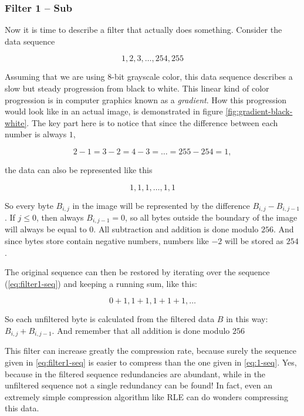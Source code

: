 \subsubsection{Filter 1 -- Sub}

Now it is time to describe a filter that actually does
something. Consider the data sequence

\begin{equation}
  \label{eq:1-seq}
  1,2,3,\dots,254,255
\end{equation}

Assuming that we are using 8-bit grayscale color, this data sequence
describes a slow but steady progression from black to white. This
linear kind of color progression is in computer graphics known as a
\textit{gradient}\cite{sayood2003lossless}. How this progression would
look like in an actual image, is demonstrated in figure
\ref{fig:gradient-black-white}. The key part here is to notice that
since the difference between each number is always $1$,

\begin{equation*}
  2-1=3-2=4-3=\dots=255-254=1,
\end{equation*}

the data can also be represented
like this

\begin{equation}
  \label{eq:filter1-seq}
  1,1,1,\dots,1,1
\end{equation}

So every byte $B_{i,j}$ in the image will be represented by the
difference $B_{i,j} - B_{i,j-1}$. If $j \le 0$, then always $B_{i,j-1}
= 0$, so all bytes outside the boundary of the image will always be
equal to $0$. All subtraction and addition is done modulo $256$. And
since bytes store contain negative numbers, numbers like $-2$ will be stored as
$254$.

The original sequence can then be restored by iterating over the
sequence (\ref{eq:filter1-seq}) and keeping a running sum, like this:

\begin{equation*}
  0+1,1+1,1+1+1,\dots
\end{equation*}

So each unfiltered byte is calculated from the filtered data $B$ in
this way:  $B_{i,j} + B_{i,j-1}$. And remember that all addition is
done modulo $256$

This filter can increase greatly the compression rate, because surely
the sequence given in \ref{eq:filter1-seq} is easier to compress than
the one given in \ref{eq:1-seq}. Yes, because in the filtered sequence
redundancies are abundant, while in the unfiltered sequence not a
single redundancy can be found! In fact, even an extremely simple
compression algorithm like RLE can do wonders compressing this data.


